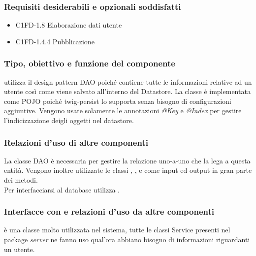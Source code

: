 \subsubsection*{Requisiti desiderabili e opzionali soddisfatti}
\begin{itemize}
    \item C1FD-1.8 Elaborazione dati utente
    \item C1FD-1.4.4 Pubblicazione
\end{itemize}
\subsubsection*{Tipo, obiettivo e funzione del componente}
 utilizza il design pattern DAO poich\'e contiene tutte le
informazioni relative ad un utente cos\`i come viene salvato all'interno del
Datastore. La classe \`e implementata come POJO poich\'e twig-persist lo
supporta senza bisogno di configurazioni aggiuntive. Vengono usate solamente
le annotazioni \emph{@Key} e \emph{@Index} per gestire l'indicizzazione
deigli oggetti nel datastore.\\
\subsubsection*{Relazioni d'uso di altre componenti} La classe DAO  \`e necessaria per gestire la relazione
uno-a-uno che la lega a questa entit\`a. Vengono inoltre utilizzate le classi
, ,  e  come
input ed output in gran parte dei metodi.\\
Per interfacciarsi al database utilizza . 
\subsubsection*{Interfacce con e relazioni d'uso da altre componenti}
 \`e una classe molto utilizzata nel sistema, tutte le classi
Service presenti nel package \emph{server} ne fanno uso qual'ora abbiano bisogno
di informazioni riguardanti un utente. 

